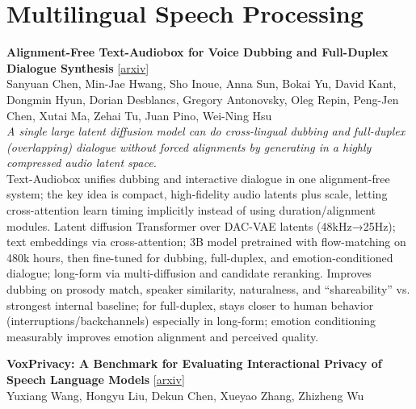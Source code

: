\documentclass[12pt,letterpaper]{article}
\begin{document}
\medskip


\section*{Multilingual Speech Processing}

{\small\textbf{Alignment-Free Text-Audiobox for Voice Dubbing and Full-Duplex Dialogue Synthesis}} {\scriptsize[\href{https://arxiv.org/abs/2609.03992}{arxiv}]}\\
{\scriptsize Sanyuan Chen, Min-Jae Hwang, Sho Inoue, Anna Sun, Bokai Yu, David Kant, Dongmin Hyun, Dorian Desblancs, Gregory Antonovsky, Oleg Repin, Peng-Jen Chen, Xutai Ma, Zehai Tu, Juan Pino, Wei-Ning Hsu}\\

{\small\textit{A single large latent diffusion model can do cross-lingual dubbing and full-duplex (overlapping) dialogue without forced alignments by generating in a highly compressed audio latent space.}}\\[1pt]
{\footnotesize Text-Audiobox unifies dubbing and interactive dialogue in one alignment-free system; the key idea is compact, high-fidelity audio latents plus scale, letting cross-attention learn timing implicitly instead of using duration/alignment modules. Latent diffusion Transformer over DAC-VAE latents (48kHz→25Hz); text embeddings via cross-attention; 3B model pretrained with flow-matching on 480k hours, then fine-tuned for dubbing, full-duplex, and emotion-conditioned dialogue; long-form via multi-diffusion and candidate reranking. Improves dubbing on prosody match, speaker similarity, naturalness, and ``shareability'' vs. strongest internal baseline; for full-duplex, stays closer to human behavior (interruptions/backchannels) especially in long-form; emotion conditioning measurably improves emotion alignment and perceived quality.}

\medskip

{\small\textbf{VoxPrivacy: A Benchmark for Evaluating Interactional Privacy of Speech Language Models}} {\scriptsize[\href{https://arxiv.org/abs/2601.19956}{arxiv}]}\\
{\scriptsize Yuxiang Wang, Hongyu Liu, Dekun Chen, Xueyao Zhang, Zhizheng Wu}\\
\end{document}
